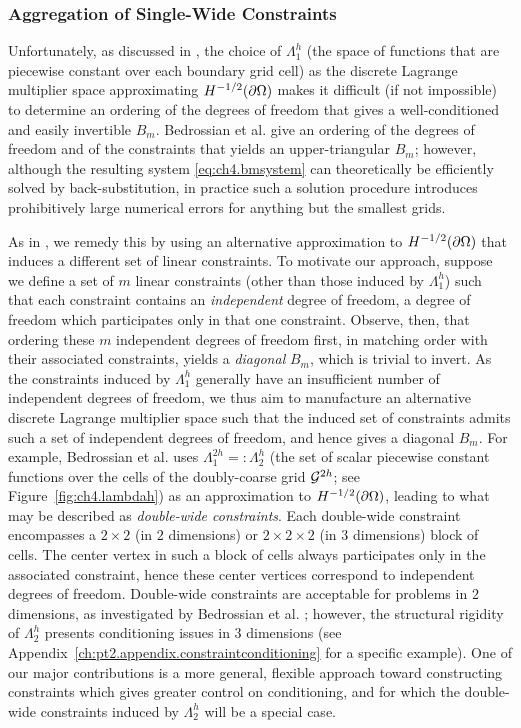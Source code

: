 \subsubsection{Aggregation of Single-Wide Constraints} \label{subsubsec:ch4.constraintaggregation}

Unfortunately, as discussed in \cite{Bedrossian10}, the choice of $\Lambda^h_1$ (the space of functions that are piecewise constant over each boundary grid cell) as the discrete Lagrange multiplier space approximating $H^{-1/2}(\partial\Omega)$ makes it difficult (if not impossible) to determine an ordering of the degrees of freedom that gives a well-conditioned and easily invertible $B_m$. Bedrossian et al. \cite{Bedrossian10} give an ordering of the degrees of freedom and of the constraints that yields an upper-triangular $B_m$; however, although the resulting system \eqref{eq:ch4.bmsystem} can theoretically be efficiently solved by back-substitution, in practice such a solution procedure introduces prohibitively large numerical errors for anything but the smallest grids.

As in \cite{Bedrossian10}, we remedy this by using an alternative approximation to $H^{-1/2}(\partial\Omega)$ that induces a different set of linear constraints. To motivate our approach, suppose we define a set of $m$ linear constraints (other than those induced by $\Lambda^h_1$) such that each constraint contains an \emph{independent} degree of freedom, a degree of freedom which participates only in that one constraint. Observe, then, that ordering these $m$ independent degrees of freedom first, in matching order with their associated constraints, yields a \emph{diagonal} $B_m$, which is trivial to invert. As the constraints induced by $\Lambda^h_1$ generally have an insufficient number of independent degrees of freedom, we thus aim to manufacture an alternative discrete Lagrange multiplier space such that the induced set of constraints admits such a set of independent degrees of freedom, and hence gives a diagonal $B_m$. For example, Bedrossian et al. \cite{Bedrossian10} uses $\Lambda^{2h}_1 =: \Lambda^h_2$ (the set of scalar piecewise constant functions over the cells of the doubly-coarse grid $\mathcal{G}^{2h}$; see Figure~\ref{fig:ch4.lambdah}) as an approximation to $H^{-1/2}(\partial\Omega)$, leading to what may be described as \emph{double-wide constraints}. Each double-wide constraint encompasses a $2 \times 2$ (in $2$ dimensions) or $2 \times 2 \times 2$ (in $3$ dimensions) block of cells. The center vertex in such a block of cells always participates only in the associated constraint, hence these center vertices correspond to independent degrees of freedom. Double-wide constraints are acceptable for problems in $2$ dimensions, as investigated by Bedrossian et al. \cite{Bedrossian10}; however, the structural rigidity of $\Lambda^h_2$ presents conditioning issues in $3$ dimensions (see Appendix~\ref{ch:pt2.appendix.constraintconditioning} for a specific example). One of our major contributions is a more general, flexible approach toward constructing constraints which gives greater control on conditioning, and for which the double-wide constraints induced by $\Lambda^h_2$ will be a special case.

